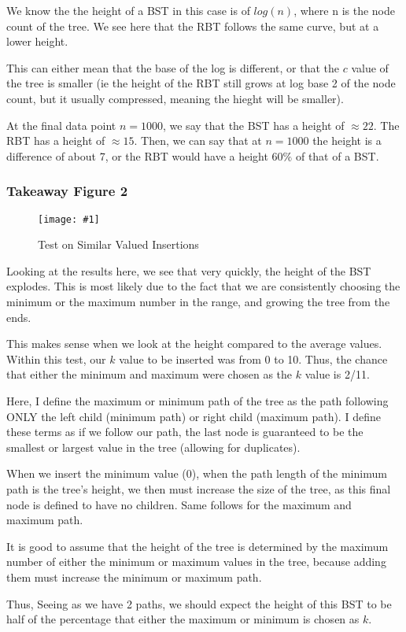 \documentclass{article}
\newcommand{\figureInsetScaled}[3]
{
    \FloatBarrier{}
    \figureRaw{#1}{#2}{#3}
    \FloatBarrier{}
}
\newcommand{\figureRaw}[3]
{
    \begin{figure}[ht!]
        \centering
        \texttt{[image: \#1]}
        \caption{#2}
    \end{figure}
}
\begin{document}
We know the the height of a BST in this case is of $log(n)$, where n is the node count of the tree. We see here that the RBT follows the same curve, but at a lower height.

This can either mean that the base of the log is different, or that the $c$ value of the tree is smaller (ie the height of the RBT still grows at log base 2 of the node count, but it usually compressed, meaning the hieght will be smaller).

At the final data point $n=1000$, we say that the BST has a height of $\approx22$. The RBT has a height of $\approx15$. Then, we can say that at $n=1000$ the height is a difference of about 7, or the RBT would have a height $60\%$ of that of a BST.

\subsubsection{Takeaway Figure 2}
\figureInsetScaled{images/experiment1/Figure_2.png}{Test on Similar Valued Insertions}{0.5}

Looking at the results here, we see that very quickly, the height of the BST explodes. This is most likely due to the fact that we are consistently choosing the minimum or the maximum number in the range, and growing the tree from the ends. 

This makes sense when we look at the height compared to the average values. Within this test, our $k$ value to be inserted was from 0 to 10. Thus, the chance that either the minimum and maximum were chosen as the $k$ value is 2/11.

Here, I define the maximum or minimum path of the tree as the path following ONLY the left child (minimum path) or right child (maximum path). I define these terms as if we follow our path, the last node is guaranteed to be the smallest or largest value in the tree (allowing for duplicates).

When we insert the minimum value (0), when the path length of the minimum path is the tree's height, we then must increase the size of the tree, as this final node is defined to have no children. Same follows for the maximum and maximum path.

It is good to assume that the height of the tree is determined by the maximum number of either the minimum or maximum values in the tree, because adding them must increase the minimum or maximum path.

Thus, Seeing as we have 2 paths, we should expect the height of this BST to be half of the percentage that either the maximum or minimum is chosen as $k$.
\end{document}
